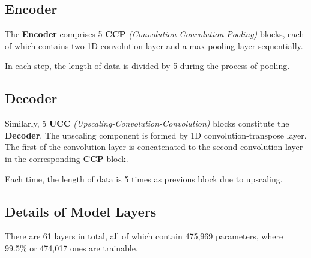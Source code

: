 \documentclass[
]{article}
\begin{document}
\hypertarget{encoder}{%
\subsection{Encoder}\label{encoder}}

The \textbf{Encoder} comprises 5 \textbf{CCP}
\emph{(Convolution-Convolution-Pooling)} blocks, each of which contains
two 1D convolution layer and a max-pooling layer sequentially.

In each step, the length of data is divided by 5 during the process of
pooling.

\hypertarget{decoder}{%
\subsection{Decoder}\label{decoder}}

Similarly, 5 \textbf{UCC} \emph{(Upscaling-Convolution-Convolution)}
blocks constitute the \textbf{Decoder}. The upscaling component is
formed by 1D convolution-transpose layer. The first of the convolution
layer is concatenated to the second convolution layer in the
corresponding \textbf{CCP} block.

Each time, the length of data is 5 times as previous block due to
upscaling.

\hypertarget{details-of-model-layers}{%
\subsection{Details of Model Layers}\label{details-of-model-layers}}

There are 61 layers in total, all of which contain 475,969 parameters,
where 99.5\% or 474,017 ones are trainable.
\end{document}
